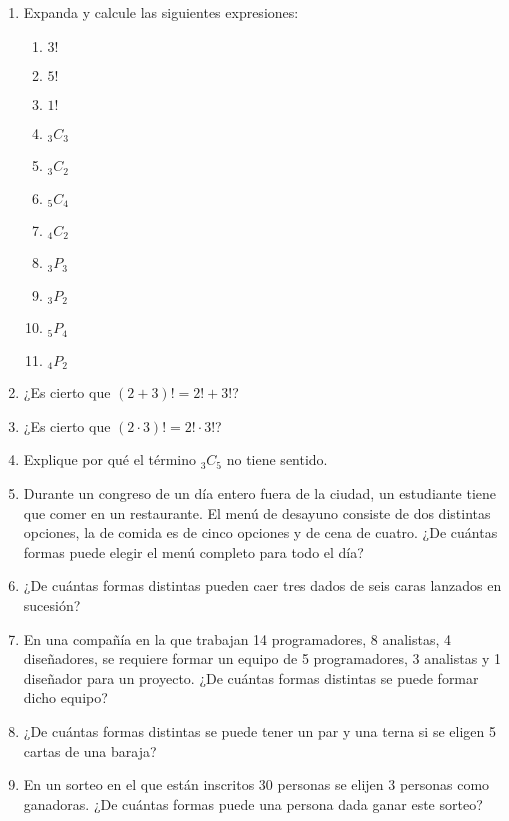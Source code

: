 \documentclass[spanish]{report}
\newcommand{\comb}[2]{ {}_{#1}C_{#2}}
\newcommand{\perm}[2]{ {}_{#1}P_{#2}}
\begin{document}
\begin{enumerate}
\item Expanda y calcule las siguientes expresiones:
	\begin{multicols}{4}\begin{enumerate} 
	\item $3!$ \item $5!$ \item $1!$ \item $\comb{3}{3}$ \item $\comb{3}{2}$ \item $\comb{5}{4}$ \item $\comb{4}{2}$ \item $\perm{3}{3}$ \item $\perm{3}{2}$ \item $\perm{5}{4}$ \item $\perm{4}{2}$
	\end{enumerate}\end{multicols}

\item ¿Es cierto que $(2+3)! = 2! + 3!$?
\item ¿Es cierto que $(2 \cdotp 3)! = 2! \cdotp 3!$?

\item Explique por qué el término $\comb{3}{5}$ no tiene sentido.


\item Durante un congreso de un día entero fuera de la ciudad, un estudiante tiene que comer en un restaurante. El menú de desayuno consiste de dos distintas opciones, la de comida es de cinco opciones y de cena de cuatro. ¿De cuántas formas puede elegir el menú completo para todo el día?

\item ¿De cuántas formas distintas pueden caer tres dados de seis caras lanzados en sucesión?

\item En una compañía en la que trabajan 14 programadores, 8 analistas, 4 diseñadores, se requiere formar un equipo de 5 programadores, 3 analistas y 1 diseñador para un proyecto. ¿De cuántas formas distintas se puede formar dicho equipo? %

\item ¿De cuántas formas distintas se puede tener un par y una terna si se eligen 5 cartas de una baraja?

\item En un sorteo en el que están inscritos 30 personas se elijen 3 personas como ganadoras. ¿De cuántas formas puede una persona dada ganar este sorteo?


\end{enumerate}
\end{document}
